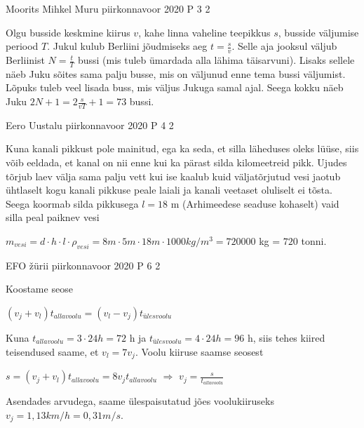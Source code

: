 \documentclass[11pt]{article}
\begin{document}
{%
{Moorits Mihkel Muru} %
{piirkonnavoor} %
{2020} %
{P 3} %
{2} %
{

\ifSolution
Olgu busside keskmine kiirus $v$, kahe linna vaheline teepikkus $s$, busside väljumise periood $T$. Jukul kulub Berliini jõudmiseks aeg $t = \frac{s}{v}$. Selle aja jooksul väljub Berliinist $N = \frac{t}{T}$ bussi (mis tuleb ümardada alla lähima täisarvuni). Lisaks sellele näeb Juku sõites sama palju busse, mis on väljunud enne tema bussi väljumist. Lõpuks tuleb veel lisada buss, mis väljus Jukuga samal ajal. Seega kokku näeb Juku $2N + 1 = 2\frac{s}{vT} +1 = 73$ bussi.
\fi
}


{Eero Uustalu} %
{piirkonnavoor} %
{2020} %
{P 4} %
{2} %
{

\ifSolution
Kuna kanali pikkust pole mainitud, ega ka seda, et silla läheduses oleks lüüse, siis võib eeldada, et kanal on nii enne kui ka pärast silda kilomeetreid pikk. Ujudes tõrjub laev välja sama palju vett kui ise kaalub kuid väljatõrjutud vesi jaotub ühtlaselt kogu kanali pikkuse peale laiali ja kanali veetaset oluliselt ei tõsta. Seega koormab silda pikkusega $l = 18$ m (Arhimeedese seaduse kohaselt) vaid silla peal paiknev vesi
\begin{center}
$m_{vesi} = d \cdot h \cdot l \cdot \rho_{vesi} = 8 m \cdot 5 m \cdot 18 m \cdot 1000 kg/m^3 = 720 000$ kg = $720$ tonni.
\end{center}
\fi
}

{EFO žürii} %
{piirkonnavoor} %
{2020} %
{P 6} %
{2} %
{

\ifSolution
Koostame seose
\begin{center}
$(v_j + v_l) t_{allavoolu} = (v_l - v_j)t_{ülesvoolu}$
\end{center}
Kuna $t_{allavoolu} = 3 \cdot 24 h = 72$ h ja $t_{ülesvoolu} = 4 \cdot 24 h = 96$ h, siis tehes kiired teisendused saame, et $v_l = 7v_j$.
\newline
Voolu kiiruse saamse seosest
\begin{center}
$s = (v_j + v_l) t_{allavoolu} = 8v_jt_{allavoolu}$ $\Rightarrow$ $v_j = \frac{s}{t_{allavoolu}}$
\end{center}
Asendades arvudega, saame ülespaisutatud jões voolukiiruseks $v_j = 1,13 km/h = 0,31 m/s$.
\fi
}

}
\end{document}
